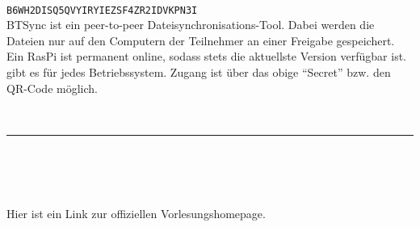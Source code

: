 \begin{minipage}{4cm}
\end{minipage}
\hfill
\begin{minipage}{\dieBreite}
	\\
	\texttt{B6WH2DISQ5QVYIRYIEZSF4ZR2IDVKPN3I} \smallskip\\
	BTSync ist ein peer-to-peer Dateisynchronisations-Tool. Dabei werden die Dateien nur auf den Computern der Teilnehmer an einer Freigabe gespeichert. Ein RasPi ist permanent 
	online, sodass stets die aktuellste Version verfügbar ist.  gibt es für jedes Betriebssystem.
	Zugang ist über das obige \enquote{Secret} bzw. den QR-Code möglich.
\end{minipage}\\[0.7cm]
\hrule \mbox{ }\\[0.7cm]
\begin{minipage}{4cm}
	\qrcode[height=3.3cm, version=6]{\homepage}
\end{minipage}
\hfill
\begin{minipage}{\dieBreite}
	\\
	\resizebox{\dieBreite}{!}{\footnotesize\url{\homepage}}\smallskip\\
	Hier ist ein Link zur offiziellen Vorlesungshomepage.
\end{minipage}
\newpage
